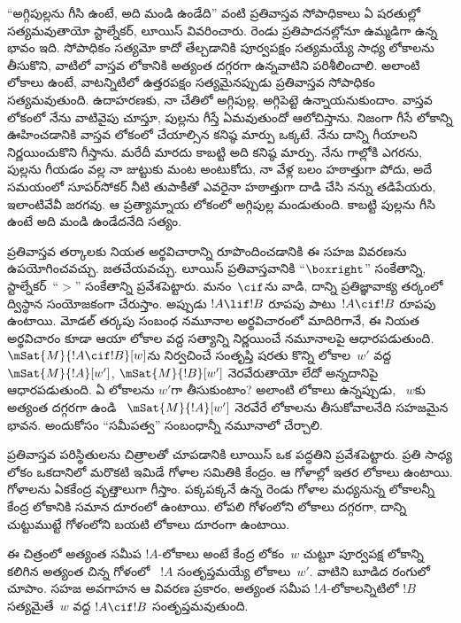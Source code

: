 \documentclass[../../../include/open-logic-section]{subfiles}
\begin{document}


``అగ్గిపుల్లను గీసి ఉంటే, అది మండి ఉండేది'' వంటి ప్రతివాస్తవ
సోపాధికాలు ఏ షరతుల్లో సత్యమవుతాయో స్టాల్నేకర్, లూయిస్
వివరించారు. రెండు ప్రతిపాదనల్లోనూ ఉమ్మడిగా ఉన్న భావం ఇది.
సోపాధికం సత్యమో కాదో తేల్చడానికి పూర్వపక్షం సత్యమయ్యే
సాధ్య లోకాలను తీసుకొని, వాటిలో వాస్తవ లోకానికి అత్యంత దగ్గరగా
ఉన్నవాటిని పరిశీలించాలి. అలాంటి లోకాలు ఉంటే, వాటన్నిటిలో
ఉత్తరపక్షం సత్యమైనప్పుడు ప్రతివాస్తవ సోపాధికం సత్యమవుతుంది.
ఉదాహరణకు, నా చేతిలో అగ్గిపుల్ల, అగ్గిపెట్టె ఉన్నాయనుకుందాం.
వాస్తవ లోకంలో నేను వాటివైపు చూస్తూ, పుల్లను
గీస్తే ఏమవుతుందో ఆలోచిస్తాను. నిజంగా గీసే లోకాన్ని ఊహించడానికి
వాస్తవ లోకంలో చేయాల్సిన కనిష్ఠ మార్పు ఒక్కటే. నేను దాన్ని
గీయాలని నిర్ణయించుకొని గీస్తాను.
మరేదీ మారదు కాబట్టి అది కనిష్ఠ మార్పు. నేను గాల్లోకి ఎగరను,
పుల్లను గీయడం వల్ల నా జుట్టుకు మంట అంటుకోదు, నా వేళ్ల బలం
హఠాత్తుగా పోదు, అదే సమయంలో సూపర్‌సోకర్ నీటి తుపాకీతో ఎవరైనా
హఠాత్తుగా దాడి చేసి నన్ను తడిపేయరు, ఇలాంటివేవీ జరగవు.
ఆ ప్రత్యామ్నాయ లోకంలో అగ్గిపుల్ల మండుతుంది. కాబట్టి పుల్లను
గీసి ఉంటే అది మండి ఉండేదనేది సత్యం.

ప్రతివాస్తవ తర్కాలకు నియత అర్థవిచారాన్ని రూపొందించడానికి ఈ సహజ వివరణను ఉపయోగించవచ్చు.
జతచేయవచ్చు. లూయిస్ ప్రతివాస్తవానికి
``$\boxright$'' సంకేతాన్ని,
స్టాల్నేకర్~``$>$'' సంకేతాన్ని
ప్రవేశపెట్టారు. మనం~$\cif$ను
వాడి, దాన్ని ప్రతిజ్ఞావాక్య తర్కంలో ద్విస్థాన సంయోజకంగా చేరుస్తాం. అప్పుడు
$!A \lif !B$ రూపపు
పాటు~$!A \cif !B$ రూపపు
ఉంటాయి. మోడల్ తర్కపు సంబంధ నమూనాల అర్థవిచారంలో మాదిరిగానే,
ఈ నియత అర్థవిచారం కూడా ఆయా లోకాల వద్ద
 సత్యాన్ని నిర్ణయించే
నమూనాలపై ఆధారపడుతుంది.
$\mSat{M}{!A \cif !B}[w]$ను
నిర్వచించే సంతృప్తి షరతు కొన్ని లోకాల~$w'$ వద్ద
$\mSat{M}{!A}[w']$, $\mSat{M}{!B}[w']$
నెరవేరుతాయో లేదో అన్నదానిపై ఆధారపడుతుంది.
ఏ లోకాలను $w'$గా తీసుకుంటాం? అలాంటి లోకాలు ఉన్నప్పుడు,
~$w$కు అత్యంత దగ్గరగా ఉండి
~$\mSat{M}{!A}[w']$ నెరవేరే లోకాలను తీసుకోవాలనేది సహజమైన భావన.
అందుకోసం ``సమీపత్వ'' సంబంధాన్నీ
నమూనాలో చేర్చాలి.

ప్రతివాస్తవ పరిస్థితులను చిత్రాలతో చూపడానికి లూయిస్ ఒక పద్ధతిని
ప్రవేశపెట్టారు. ప్రతి సాధ్య లోకం ఒకదానిలో మరొకటి ఇమిడే గోళాల
సమితికి కేంద్రం. ఆ గోళాల్లో ఇతర లోకాలు ఉంటాయి. గోళాలను
ఏకకేంద్ర వృత్తాలుగా గీస్తాం. పక్కపక్కనే ఉన్న రెండు గోళాల మధ్యనున్న లోకాలన్నీ
కేంద్ర లోకానికి సమాన దూరంలో ఉంటాయి. లోపలి గోళంలోని లోకాలు
దగ్గరగా, దాన్ని చుట్టుముట్టే గోళంలోని బయటి లోకాలు దూరంగా ఉంటాయి.
\begin{center}
\end{center}
ఈ చిత్రంలో అత్యంత సమీప $!A$-లోకాలు అంటే
కేంద్ర లోకం~$w$ చుట్టూ పూర్వపక్ష లోకాన్ని కలిగిన అత్యంత చిన్న గోళంలో
~$!A$ సంతృప్తమయ్యే లోకాలు~$w'$. వాటిని బూడిద రంగులో చూపాం. సహజ అవగాహన
ఆ వివరణ ప్రకారం, అత్యంత సమీప
$!A$-లోకాలన్నిటిలో $!B$
సత్యమైతే~$w$ వద్ద
$!A \cif !B$ సంతృప్తమవుతుంది.
\end{document}
